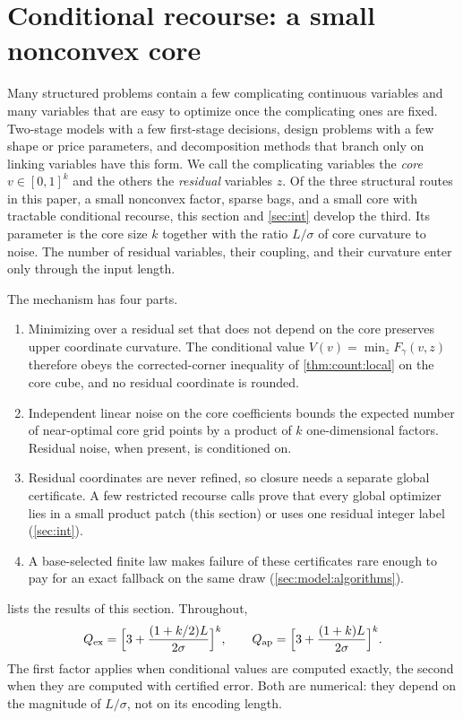\section{Conditional recourse: a small nonconvex core}\label{sec:rec}

Many structured problems contain a few complicating continuous variables
and many variables that are easy to optimize once the complicating ones are
fixed. Two-stage models with a few first-stage decisions, design problems
with a few shape or price parameters, and decomposition methods that branch
only on linking variables have this form. We call the complicating variables
the \emph{core} $v\in[0,1]^k$ and the others the \emph{residual} variables
$z$. Of the three structural routes in this paper, a small nonconvex factor,
sparse bags, and a small core with tractable conditional recourse, this
section and \cref{sec:int} develop the third. Its parameter is the core
size $k$ together with the ratio $L/\sigma$ of core curvature to noise. The
number of residual variables, their coupling, and their curvature enter only
through the input length.

The mechanism has four parts.
\begin{enumerate}[label=(\roman*)]
\item Minimizing over a residual set that does not depend on the core
preserves upper coordinate curvature. The conditional value
$V(v)=\min_zF_\gamma(v,z)$ therefore obeys the corrected-corner inequality
of \cref{thm:count:local} on the core cube, and no residual coordinate is
rounded.
\item Independent linear noise on the core coefficients bounds the expected
number of near-optimal core grid points by a product of $k$ one-dimensional
factors. Residual noise, when present, is conditioned on.
\item Residual coordinates are never refined, so closure needs a separate
global certificate. A few restricted recourse calls prove that every global
optimizer lies in a small product patch (this section) or uses one residual
integer label (\cref{sec:int}).
\item A base-selected finite law makes failure of these certificates rare
enough to pay for an exact fallback on the same draw
(\cref{sec:model:algorithms}).
\end{enumerate}
 lists the results of this section. Throughout,
\begin{equation}\label{eq:rec:Q}
 Q_{\rm ex}=\Bigl[3+\frac{(1+k/2)L}{2\sigma}\Bigr]^k,
 \qquad
 Q_{\rm ap}=\Bigl[3+\frac{(1+k)L}{2\sigma}\Bigr]^k .
\end{equation}
The first factor applies when conditional values are computed exactly, the
second when they are computed with certified error. Both are numerical:
they depend on the magnitude of $L/\sigma$, not on its encoding length.

